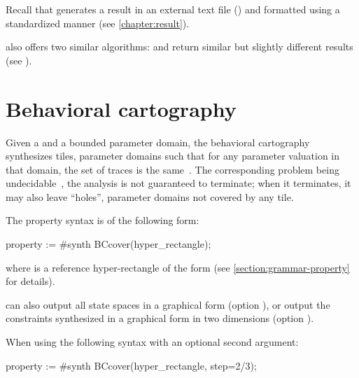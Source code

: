 Recall that \imitator{} %
generates
a result in an external text file () and formatted using a standardized manner (see \cref{chapter:result}). %


\imitator{} also offers two similar algorithms:  and  return similar but slightly different results (see \cite{AS11}).


\section{Behavioral cartography}\label{section:algorithm:BC}

Given a \NIPTA{} and a bounded parameter domain, the behavioral cartography~\BC{} synthesizes tiles, \ie{} parameter domains such that for any parameter valuation in that domain, the set of traces is the same~\cite{AF10}.
The corresponding problem being undecidable~\cite{ALM20}, the analysis is not guaranteed to terminate; when it terminates, it may also leave ``holes'', \ie{} parameter domains not covered by any tile.

The property syntax is of the following form:

\begin{IMITATORproperty}
property := #synth BCcover(hyper_rectangle);
\end{IMITATORproperty}

\noindent{}
where  is a reference hyper-rectangle of the form  (see \cref{section:grammar-property} for details).


\imitator{} can also
output all state spaces in a graphical form (option ),
or
output the constraints synthesized in a graphical form in two dimensions (option ).

When using the following syntax with an optional second argument:

\begin{IMITATORproperty}
property := #synth BCcover(hyper_rectangle, step=2/3);
\end{IMITATORproperty}

